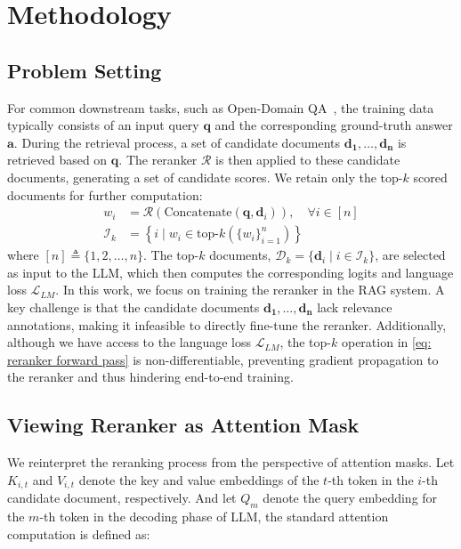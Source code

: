 \section{Methodology}

\subsection{Problem Setting}
For common downstream tasks, such as Open-Domain QA~\cite{DBLP:journals/corr/abs-2101-00774}, the training data typically consists of an input query $\mathbf{q}$ and the corresponding ground-truth answer $\mathbf{a}$. During the retrieval process, a set of candidate documents $\mathbf{d_1}, \dots, \mathbf{d_n}$ is retrieved based on $\mathbf{q}$. The reranker $\mathcal{R}$ is then applied to these candidate documents, generating a set of candidate scores. We retain only the top-\(k\) scored documents for further computation:
\begin{equation}
\begin{aligned}\label{eq: reranker forward pass}
    w_i &= \mathcal{R}(\text{Concatenate}(\mathbf{q}, \mathbf{d}_i)), \quad \forall i \in [n] \\
    \mathcal{I}_k &=\left\{ i \mid w_i \in \text{top-}k \left( \{ w_i \}_{i=1}^n \right) \right\}
\end{aligned}
\end{equation}
where $[n] \triangleq \{1, 2, \dots, n\}$. The top-$k$ documents, $\mathcal{D}_k= \{\mathbf{d}_i \mid i \in \mathcal{I}_k \}$, are selected as input to the LLM, which then computes the corresponding logits and language loss $\mathcal{L}_{LM}$. In this work, we focus on training the reranker in the RAG system. A key challenge is that the candidate documents $\mathbf{d_1}, \dots, \mathbf{d_n}$ lack relevance annotations, making it infeasible to directly fine-tune the reranker. Additionally, although we have access to the language loss $\mathcal{L}_{LM}$, the top-$k$ operation in \autoref{eq: reranker forward pass} is non-differentiable, preventing gradient propagation to the reranker and thus hindering end-to-end training.

\subsection{Viewing Reranker as Attention Mask}\label{sec: Viewing Reranker as Attention Mask}
We reinterpret the reranking process from the perspective of attention masks. Let $K_{i,t}$ and $V_{i,t}$ denote the key and value embeddings of the $t$-th token in the $i$-th candidate document, respectively. And let $Q_m$ denote the query embedding for the $m$-th token in the decoding phase of LLM, the standard attention computation is defined as:

